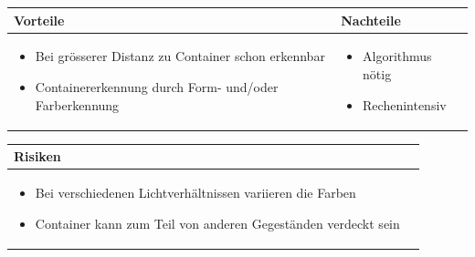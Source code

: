 \begin{table}[h]
\begin{tabular}{p{} | p{}}


\textbf{Vorteile} & \textbf{Nachteile} \\ \hline
	 
\begin{itemize}
\item Bei grösserer Distanz zu Container schon erkennbar
\item Containererkennung durch Form- und/oder Farberkennung
\end{itemize}

 
 &
 
\begin{itemize}
\item Algorithmus nötig
\item Rechenintensiv
\end{itemize}

\end{tabular}
\end{table}

\begin{table}[h]
\begin{tabular}{p{}p{}}

\textbf{Risiken} & \\ \hline
	 
\begin{itemize}
\item Bei verschiedenen Lichtverhältnissen variieren die Farben
\item Container kann zum Teil von anderen Gegeständen verdeckt sein
\end{itemize}

 
\end{tabular}
\end{table}

\pagebreak